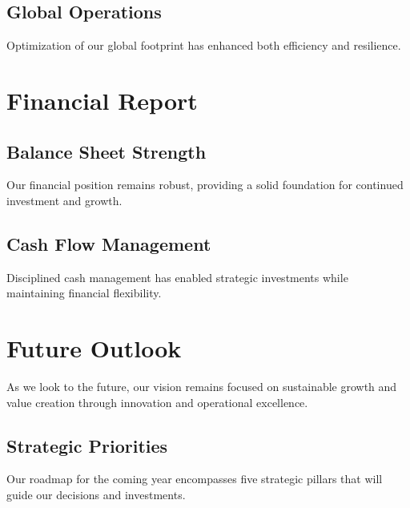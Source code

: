 \documentclass[11pt,a4paper]{article}
\begin{document}
\lipsum[4]

\subsection{Global Operations}

Optimization of our global footprint has enhanced both efficiency and resilience.

\lipsum[5]

\section{Financial Report}

\subsection{Balance Sheet Strength}

Our financial position remains robust, providing a solid foundation for continued investment and growth.

\lipsum[6]

\subsection{Cash Flow Management}

Disciplined cash management has enabled strategic investments while maintaining financial flexibility.

\lipsum[7]

\section{Future Outlook}

As we look to the future, our vision remains focused on sustainable growth and value creation through innovation and operational excellence.

\lipsum[8]

\subsection{Strategic Priorities}

Our roadmap for the coming year encompasses five strategic pillars that will guide our decisions and investments.

\lipsum[9]
\end{document}
